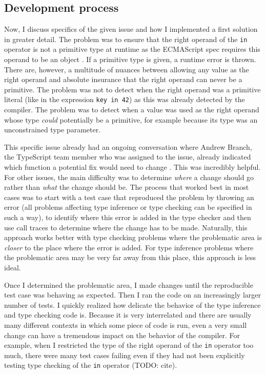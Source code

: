 \documentclass[12pt]{scrartcl}
\def\code#1{\texttt{\frenchspacing#1}}
\begin{document}
\subsection{Development process}
\label{development_process}

Now, I discuss specifics of the given issue and how I implemented a first solution in greater detail. The problem was to ensure that the right operand of the \code{in} operator is not a primitive type at runtime as the ECMAScript spec requires this operand to be an object \cite{InOperator}. If a primitive type is given, a runtime error is thrown. There are, however, a multitude of nuances between allowing any value as the right operand and absolute insurance that the right operand can never be a primitive. The problem was not to detect when the right operand was a primitive literal (like in the expression \code{key in 42}) as this was already detected by the compiler. The problem was to detect when a value was used as the right operand whose type \textit{could} potentially be a primitive, for example because its type was an unconstrained type parameter.

This specific issue already had an ongoing conversation where Andrew Branch, the TypeScript team member who was assigned to the issue, already indicated which function a potential fix would need to change \cite{41317Comment}. This was incredibly helpful. For other issues, the main difficulty was to determine \textit{where} a change should go rather than \textit{what} the change should be. The process that worked best in most cases was to start with a test case that reproduced the problem by throwing an error (all problems affecting type inference or type checking can be specified in such a way), to identify where this error is added in the type checker and then use call traces to determine where the change has to be made. Naturally, this approach works better with type checking problems where the problematic area is \textit{closer} to the place where the error is added. For type inference problems where the problematic area may be very far away from this place, this approach is less ideal.

Once I determined the problematic area, I made changes until the reproducible test case was behaving as expected. Then I ran the code on an increasingly larger number of tests. I quickly realized how delicate the behavior of the type inference and type checking code is. Because it is very interrelated and there are usually many different contexts in which some piece of code is run, even a very small change can have a tremendous impact on the behavior of the compiler. For example, when I restricted the type of the right operand of the \code{in} operator too much, there were many test cases failing even if they had not been explicitly testing type checking of the \code{in} operator (TODO: cite).
\end{document}
